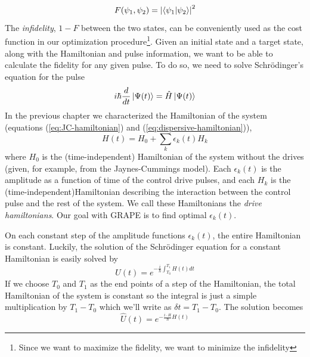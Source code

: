 \begin{equation} \label{def:fid}
F (\psi_1, \psi_2) = \abs{\braket{\psi_1}{\psi_2}}^2
\end{equation}
The \textit{infidelity}, $1 - F$ between the two states, can be conveniently used as the cost function in our optimization procedure\footnote{Since we want to maximize the fidelity, we want to minimize the infidelity}. Given an initial state and a target state, along with the Hamiltonian and pulse information, we want to be able to calculate the fidelity for any given pulse. To do so, we need to solve Schr\"{o}dinger's equation for the pulse
\begin{equation}
i\hbar\frac{d}{dt}\ket{\Psi (t)} = \hat{H}\ket{\Psi (t)}
\end{equation}
In the previous chapter we characterized the Hamiltonian of the system (equations (\ref{eq:JC-hamiltonian}) and (\ref{eq:dispersive-hamiltonian})),
\begin{equation} \label{eq:hamiltonianl_form}
H (t) = H_0 + \sum_k{\epsilon_k (t) H_k} %
\end{equation}
where $H_0$ is the (time-independent) Hamiltonian of the system without the drives (given, for example, from the Jaynes-Cummings model). Each $\epsilon_k (t)$ is the amplitude as a function of time of the control drive pulses, and each $H_k$ is the (time-independent)Hamiltonian describing the interaction between the control pulse and the rest of the system. We call these Hamiltonians the \textit{drive hamiltonians}. Our goal with GRAPE is to find optimal $\epsilon_k (t)$.

On each constant step of the amplitude functions $\epsilon_k (t)$, the entire Hamiltonian is constant. Luckily, the solution of the Schr\"{o}dinger equation for a constant Hamiltonian is easily solved by
\begin{equation}
\hat{U} (t) = e^{-\frac{i}{\hbar}\int_{T_0}^{T_1}H (t)dt}
\end{equation}
If we choose $T_0$ and $T_1$ as the end points of a step of the Hamiltonian, the total Hamiltonian of the system is constant so the integral is just a simple multiplication by $T_1-T_0$ which we'll write as $\delta t = T_1 - T_0$. The solution becomes
\begin{equation}
\hat{U} (t) = e^{-\frac{i\cdot \delta t}{\hbar}H (t)}
\end{equation}

